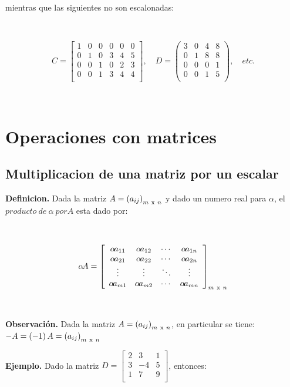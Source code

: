 \documentclass[11pt, conference]{IEEEtran}
\begin{document}
{\

mientras que las siguientes no son escalonadas:

\

\[
	C = \left[
    \begin{array}{cccccc}
    1 & 0 & 0 & 0 & 0 & 0 \\
    0 & 1 & 0 & 3 & 4 & 5 \\
    0 & 0 & 1 & 0 & 2 & 3\\
    0 & 0 & 1 & 3 & 4 & 4 \\
    \end{array}
    \right],\quad
    D = \left(
    \begin{array}{cccc}
    3 & 0 & 4 & 8 \\
    0 & 1 & 8 & 8 \\
    0 & 0 & 0 & 1\\
    0 & 0 & 1 & 5\\
    \end{array}
    \right),\quad etc.
\]

\

\section{Operaciones con matrices}
\subsection{Multiplicacion de una matriz por un escalar}
\smallskip
\textbf{Definicion.} Dada la matriz $A = \left(a_{ij}\right)_{m\ \textnormal{x}\ n}$ y dado un numero real para $\alpha$, el $producto\ de\ \alpha\ por A$ esta dado por:

\

\[
	\alpha\!A = \left[
  \begin{array}{cccc}
  \alpha\!a_{11} & \alpha\!a_{12} & \cdots & \alpha\!a_{1n} \\
  \alpha\!a_{21} & \alpha\!a_{22} & \cdots & \alpha\!a_{2n} \\
  \vdots & \vdots &\ddots & \vdots \\
  \alpha\!a_{m1} & \alpha\!a_{m2} & \cdots & \alpha\!a_{mn} \\
  \end{array} \right]_{m\ \textnormal{x}\ n}
\]

\

\begin{center}
	\textbf{Observación.} Dada la matriz $A = \left(a_{ij}\right)_{m\ \textnormal{x}\ n}$, en particular se tiene:$-A = \left(-1\right)A = \left(a_{ij}\right)_{m\ \textnormal{x}\ n}$
\end{center}
\textbf{Ejemplo.} Dado la matriz
$
	D = \left[
    \begin{array}{ccc}
    2 & 3 & 1 \\
    3 & -4 & 5 \\
    1 & 7 & 9\\
    \end{array}
    \right]
$, entonces:

}
\end{document}
